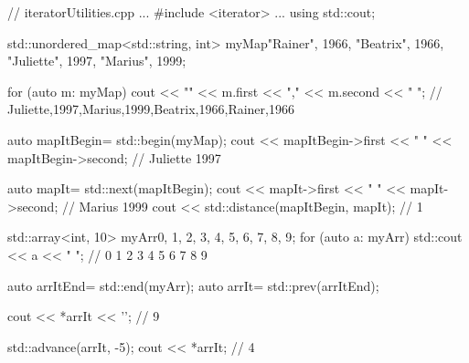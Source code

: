 \begin{cpp}
// iteratorUtilities.cpp
...
#include <iterator>
...
using std::cout;

std::unordered_map<std::string, int> myMap{{"Rainer", 1966}, {"Beatrix", 1966},
											{"Juliette", 1997}, {"Marius", 1999}};
	
for (auto m: myMap) cout << "{" << m.first << "," << m.second << "} ";
	// {Juliette,1997},{Marius,1999},{Beatrix,1966},{Rainer,1966}
	
auto mapItBegin= std::begin(myMap);
cout << mapItBegin->first << " " << mapItBegin->second; // Juliette 1997

auto mapIt= std::next(mapItBegin);
cout << mapIt->first << " " << mapIt->second; // Marius 1999
cout << std::distance(mapItBegin, mapIt); // 1

std::array<int, 10> myArr{0, 1, 2, 3, 4, 5, 6, 7, 8, 9};
for (auto a: myArr) std::cout << a << " "; // 0 1 2 3 4 5 6 7 8 9

auto arrItEnd= std::end(myArr);
auto arrIt= std::prev(arrItEnd);

cout << *arrIt << '\n'; // 9

std::advance(arrIt, -5);
cout << *arrIt; // 4
\end{cpp}


















